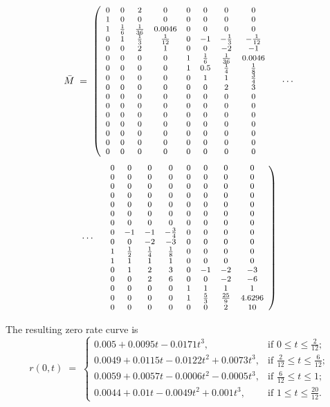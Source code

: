 \begin{equation}
\bar M \;=\;
{\footnotesize
\left(\begin{array}{cccccccc}
0&0&2&0&0&0&0&0\\
1&0&0&0&0&0&0&0\\
1&\frac16&\frac1{36}&0.0046&0&0&0&0\\
0&1&\frac13&\frac1{12}&0&-1&-\frac13&-\frac1{12}\\
0&0&2&1&0&0&-2&-1\\
0&0&0&0&1&\frac16&\frac1{36}&0.0046\\
0&0&0&0&1&0.5&\frac14&\frac18\\
0&0&0&0&0&1&1&\frac34\\
0&0&0&0&0&0&2&3\\
0&0&0&0&0&0&0&0\\
0&0&0&0&0&0&0&0\\
0&0&0&0&0&0&0&0\\
0&0&0&0&0&0&0&0\\
0&0&0&0&0&0&0&0\\
0&0&0&0&0&0&0&0\\
0&0&0&0&0&0&0&0
\end{array}\right.}
\quad\cdots
\end{equation}
\begin{equation}
\cdots\quad
{\footnotesize
\left.\begin{array}{cccccccc}
0&0&0&0&0&0&0&0\\
0&0&0&0&0&0&0&0\\
0&0&0&0&0&0&0&0\\
0&0&0&0&0&0&0&0\\
0&0&0&0&0&0&0&0\\
0&0&0&0&0&0&0&0\\
0&0&0&0&0&0&0&0\\
0&-1&-1&-\frac34&0&0&0&0\\
0&0&-2&-3&0&0&0&0\\
1&\frac12&\frac14&\frac18&0&0&0&0\\
1&1&1&1&0&0&0&0\\
0&1&2&3&0&-1&-2&-3\\
0&0&2&6&0&0&-2&-6\\
0&0&0&0&1&1&1&1\\
0&0&0&0&1&\frac53&\frac{25}9&4.6296\\
0&0&0&0&0&0&2&10
\end{array}\right)}
\end{equation}

The resulting zero rate curve is
\begin{equation}
r(0,t) \;=\;
\begin{cases}
0.005+0.0095t-0.0171t^3, & \text{if } 0\le t\le\frac2{12};\\
0.0049+0.0115t-0.0122t^2+0.0073t^3, & \text{if } \frac2{12}\le t\le\frac6{12};\\
0.0059+0.0057t-0.0006t^2-0.0005t^3, & \text{if } \frac6{12}\le t\le1;\\
0.0044+0.01t-0.0049t^2+0.001t^3, & \text{if } 1\le t\le\frac{20}{12}.
\end{cases}
\end{equation}

